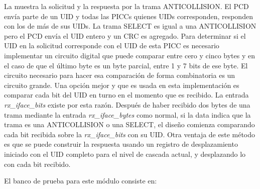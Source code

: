 \documentclass[a4paper, twoside, 11pt]{report}
\begin{document}
\newpage

La  muestra la solicitud y la respuesta por la trama ANTICOLLISION. El PCD envía parte de un UID y todas las PICCs quienes UIDs corresponden, responden con los de más de sus UIDs. La trama SELECT es igual a una ANTICOLLISION pero el PCD envía el UID entero y un CRC es agregado. Para determinar si el UID en la solicitud corresponde con el UID de esta PICC es necesario implementar un circuito digital que puede comparar entre cero y cinco bytes y en el caso de que el último byte es un byte parcial, entre 1 y 7 bits de ese byte. El circuito necesario para hacer esa comparación de forma combinatoria es un circuito grande. Una opción mejor y que es usada en esta implementación es comparar cada bit del UID en turno en el momento que es recibido. La entrada \textit{rx\_iface\_bits} existe por esta razón. Después de haber recibido dos bytes de una trama mediante la entrada \textit{rx\_iface\_bytes} como normal, si la data indica que la trama es una ANTICOLLISION o una SELECT, el diseño comienza comparando cada bit recibida sobre la \textit{rx\_iface\_bits} con su UID. Otra ventaja de este método es que se puede construir la respuesta usando un registro de desplazamiento iniciado con el UID completo para el nivel de cascada actual, y desplazando lo con cada bit recibido.

El banco de prueba para este módulo consiste en:
\end{document}
